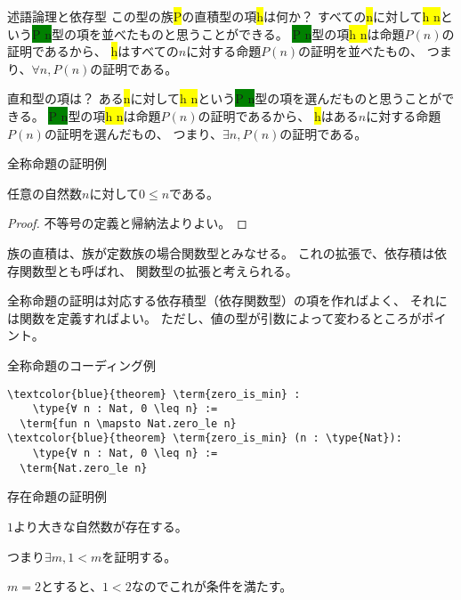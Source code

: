 \documentclass[unicode,12pt]{beamer}%
\newcommand{\type}[1]{\colorbox{green}{#1}}
\newcommand{\term}[1]{\colorbox{yellow}{#1}}
\begin{document}
\begin{frame}{述語論理と依存型}
  この型の族\term{P}の直積型の項\term{h}は何か？
  すべての\term{n}に対して\term{h n}という\type{P n}型の項を並べたものと思うことができる。
  \type{P n}型の項\term{h n}は命題$P(n)$の証明であるから、
  \term{h}はすべての$n$に対する命題$P(n)$の証明を並べたもの、
  つまり、$\forall n, P(n)$の証明である。

  \pause

  直和型の項は？
  ある\term{n}に対して\term{h n}という\type{P n}型の項を選んだものと思うことができる。
  \type{P n}型の項\term{h n}は命題$P(n)$の証明であるから、
  \term{h}はある$n$に対する命題$P(n)$の証明を選んだもの、
  つまり、$\exists n, P(n)$の証明である。
\end{frame}

\begin{frame}{全称命題の証明例}
  \begin{theorem}
    任意の自然数$n$に対して$0\leq n$である。
  \end{theorem}

  \begin{proof}
    不等号の定義と帰納法よりよい。
  \end{proof}

  \pause
  族の直積は、族が定数族の場合関数型とみなせる。
  これの拡張で、依存積は依存関数型とも呼ばれ、
  関数型の拡張と考えられる。

  \pause

  全称命題の証明は対応する依存積型（依存関数型）の項を作ればよく、
  それには関数を定義すればよい。
  ただし、値の型が引数によって変わるところがポイント。
\end{frame}

\begin{frame}[fragile]{全称命題のコーディング例}
  \begin{tcolorbox}[title=Quantifier.lean]
  \setlength{\baselineskip}{12pt}
  \begin{Verbatim}[commandchars=\\\{\}, baselinestretch=1.5]
\textcolor{blue}{theorem} \term{zero_is_min} :
    \type{∀ n : Nat, 0 \leq n} :=
  \term{fun n \mapsto Nat.zero_le n}
\textcolor{blue}{theorem} \term{zero_is_min} (n : \type{Nat}):
    \type{∀ n : Nat, 0 \leq n} :=
  \term{Nat.zero_le n}
  \end{Verbatim}
  \end{tcolorbox}  
\end{frame}

\begin{frame}{存在命題の証明例}
  \begin{theorem}
    $1$より大きな自然数が存在する。    
  \end{theorem}

  つまり$\exists m, 1 < m$を証明する。

  \begin{problem}
    $m=2$とすると、$1 < 2$なのでこれが条件を満たす。    
  \end{problem}
\end{frame}
\end{document}
